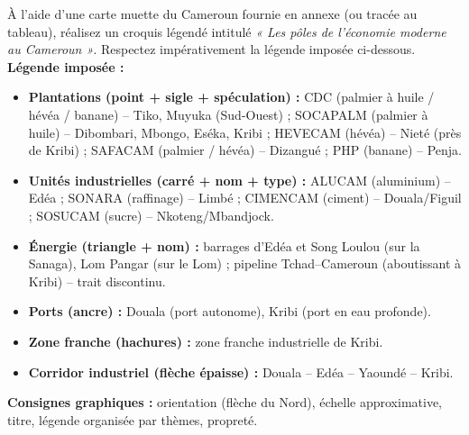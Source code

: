 \documentclass[11pt]{article}
\begin{document}
\begin{exercice}
À l'aide d'une carte muette du Cameroun fournie en annexe (ou tracée au tableau), réalisez un croquis légendé intitulé \emph{« Les pôles de l'économie moderne au Cameroun »}. Respectez impérativement la légende imposée ci-dessous.
\textbf{Légende imposée :}
\begin{itemize}
    \item \textbf{Plantations (point + sigle + spéculation) :} CDC (palmier à huile / hévéa / banane) -- Tiko, Muyuka (Sud-Ouest) ; SOCAPALM (palmier à huile) -- Dibombari, Mbongo, Eséka, Kribi ; HEVECAM (hévéa) -- Nieté (près de Kribi) ; SAFACAM (palmier / hévéa) -- Dizangué ; PHP (banane) -- Penja.
    \item \textbf{Unités industrielles (carré + nom + type) :} ALUCAM (aluminium) -- Edéa ; SONARA (raffinage) -- Limbé ; CIMENCAM (ciment) -- Douala/Figuil ; SOSUCAM (sucre) -- Nkoteng/Mbandjock.
    \item \textbf{Énergie (triangle + nom) :} barrages d'Edéa et Song Loulou (sur la Sanaga), Lom Pangar (sur le Lom) ; pipeline Tchad--Cameroun (aboutissant à Kribi) -- trait discontinu.
    \item \textbf{Ports (ancre) :} Douala (port autonome), Kribi (port en eau profonde).
    \item \textbf{Zone franche (hachures) :} zone franche industrielle de Kribi.
    \item \textbf{Corridor industriel (flèche épaisse) :} Douala -- Edéa -- Yaoundé -- Kribi.
\end{itemize}
\textbf{Consignes graphiques :} orientation (flèche du Nord), échelle approximative, titre, légende organisée par thèmes, propreté.
\end{exercice}
\end{document}
